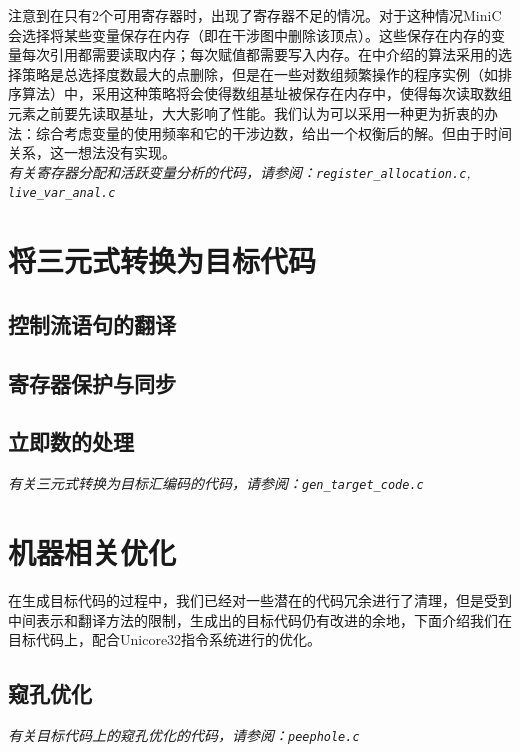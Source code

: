 注意到在只有2个可用寄存器时，出现了寄存器不足的情况。对于这种情况MiniC会选择将某些变量保存在内存（即在干涉图中删除该顶点）。这些保存在内存的变量每次引用都需要读取内存；每次赋值都需要写入内存。在\cite{sunjiasu}中介绍的算法采用的选择策略是总选择度数最大的点删除，但是在一些对数组频繁操作的程序实例（如排序算法）中，采用这种策略将会使得数组基址被保存在内存中，使得每次读取数组元素之前要先读取基址，大大影响了性能。我们认为可以采用一种更为折衷的办法：综合考虑变量的使用频率和它的干涉边数，给出一个权衡后的解。但由于时间关系，这一想法没有实现。\\
{\it \anchor 有关寄存器分配和活跃变量分析的代码，请参阅：\verb|register_allocation.c|, \verb|live_var_anal.c|}\\
\section{将三元式转换为目标代码}
\label{tripletotarget}
\subsection{控制流语句的翻译}

\subsection{寄存器保护与同步}
\label{registerprotect}
\subsection{立即数的处理}

{\it \anchor 有关三元式转换为目标汇编码的代码，请参阅：\verb|gen_target_code.c|}\\
\section{机器相关优化}
\label{depopt}
在生成目标代码的过程中，我们已经对一些潜在的代码冗余进行了清理，但是受到中间表示和翻译方法的限制，生成出的目标代码仍有改进的余地，下面介绍我们在目标代码上，配合Unicore32指令系统进行的优化。
\subsection{窥孔优化}
\label{peephole:target}
{\it \anchor 有关目标代码上的窥孔优化的代码，请参阅：\verb|peephole.c|}\\
